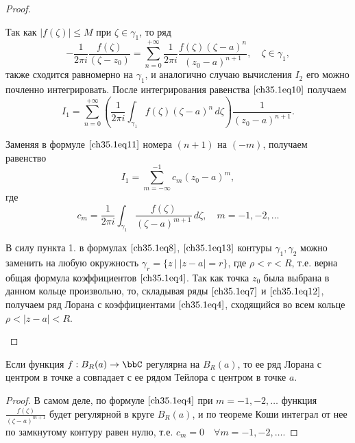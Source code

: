 \begin{leftbar}
\begin{proof}
\begin{enumerate}
Так как $|f(\zeta)| \le M$ при $\zeta \in \gamma_1$, то ряд
\begin{equation} \label{ch35.1eq10}
-\frac{1}{2\pi i} \frac{f(\zeta)}{(\zeta - z_0)} = \sum\limits_{n = 0}^{+\infty} \frac{1}{2\pi i} \frac{f(\zeta)(\zeta - a)^n}{(z_0 - a)^{n + 1}}, \quad \zeta \in \gamma_1,
\end{equation}
также сходится равномерно на $\gamma_1$, и аналогично случаю вычисления $I_2$ его можно почленно интегрировать. После интегрирования равенства $\eqref{ch35.1eq10}$ получаем
\begin{equation} \label{ch35.1eq11}
I_1 = \sum\limits_{n = 0}^{+\infty} \left( \frac{1}{2\pi i} \int_{\gamma_1} f(\zeta)(\zeta - a)^n \,d\zeta\right) \frac{1}{(z_0 - a)^{n + 1}}.
\end{equation}

Заменяя в формуле $\eqref{ch35.1eq11}$ номера $(n + 1)$ на $(-m)$, получаем равенство
\begin{equation} \label{ch35.1eq12}
I_1 = \sum\limits_{m = -\infty}^{-1} c_m (z_0 - a)^m,
\end{equation}
где
\begin{equation} \label{ch35.1eq13}
c_m = \frac{1}{2\pi i} \int_{\gamma_1} \frac{f(\zeta)}{(\zeta - a)^{m + 1}} \,d\zeta, \quad m = -1,-2,\ldots
\end{equation}

В силу пункта 1. в формулах $\eqref{ch35.1eq8}$, $\eqref{ch35.1eq13}$ контуры $\gamma_1, \gamma_2$ можно заменить на любую окружность $\gamma_r = \{ z \: \big| \: |z - a| = r\}$, где $\rho < r < R$, т.е.
верна общая формула коэффициентов $\eqref{ch35.1eq4}$. Так как точка $z_0$ была выбрана в данном кольце произвольно, то, складывая ряды $\eqref{ch35.1eq7}$ и $\eqref{ch35.1eq12}$, получаем ряд Лорана с коэффициентами $\eqref{ch35.1eq4}$, сходящийся во всем кольце $\rho < |z - a| < R$.	

\end{enumerate}

\end{proof}
\end{leftbar}

\begin{cons} \label{ch35.1cons1}
Если функция $f : B_R(a) \to \bbC$ регулярна на $B_R(a)$, то ее ряд Лорана с центром в точке а совпадает с ее рядом Тейлора с центром в точке $a$.
\end{cons}
\begin{proof}
В самом деле, по формуле $\eqref{ch35.1eq4}$ при $m = -1,-2, \ldots$ функция $\frac{f(\zeta)}{(\zeta - a)^{m+1}}$ будет регулярной в круге $B_R(a)$, и по теореме Коши интеграл от нее по замкнутому контуру равен нулю, т.е. $c_m = 0 \quad \forall m = -1,-2, \ldots$.
\end{proof}

